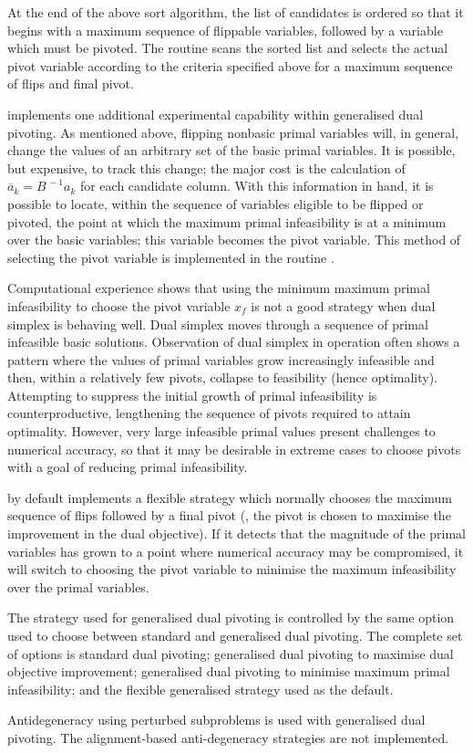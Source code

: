 At the end of the above sort algorithm, the list of candidates is ordered so
that it begins with a maximum sequence of flippable variables, followed by a
variable which must be pivoted.
The routine  scans the sorted list and selects the
actual pivot variable according to the criteria specified above for a maximum
sequence of flips and final pivot.

\dylp implements one additional experimental capability within generalised dual
pivoting.
As mentioned above, flipping nonbasic primal variables will, in general,
change the values of an arbitrary set of the basic primal variables.
It is possible, but expensive, to track this change; the major
cost is the calculation of $\overline{a}_k = B^{\,-1} a_k$ for each candidate
column.
With this information in hand, it is possible to locate, within the sequence of
variables eligible to be flipped or pivoted, the point at which the maximum
primal infeasibility is at a minimum over the basic variables; this variable
becomes the pivot variable.
This method of selecting the pivot variable is implemented in the routine
.

Computational experience shows that using the minimum maximum
primal infeasibility to choose the pivot variable $x_f$ is not a good
strategy when dual simplex is behaving well.
Dual simplex moves through a sequence of primal infeasible basic solutions.
Observation of dual simplex in operation often shows a pattern where the values
of primal variables grow increasingly infeasible and then, within a relatively
few pivots, collapse to feasibility (hence optimality).
Attempting to suppress the initial growth of primal infeasibility is
counterproductive, lengthening the sequence of pivots required to attain
optimality.
However, very large infeasible primal values present challenges to numerical
accuracy, so that it may be desirable in extreme cases to choose pivots
with a goal of reducing primal infeasibility.

\dylp by default implements a flexible strategy which normally chooses
the maximum sequence of flips followed by a final pivot (\ie, the pivot is
chosen to maximise the improvement in the dual objective).
If it detects that the magnitude of the primal variables has grown to a point
where numerical accuracy may be compromised, it will switch to choosing the 
pivot variable to minimise the maximum infeasibility over the primal variables.

The strategy used for generalised dual pivoting is controlled by the same
option used to choose between standard and generalised dual pivoting.
The complete set of options is standard dual pivoting;
generalised dual pivoting to maximise dual objective improvement;
generalised dual pivoting to minimise maximum primal infeasibility;
and the flexible generalised strategy used as the default.

Antidegeneracy using perturbed subproblems is used with generalised dual
pivoting.
The alignment-based anti-degeneracy strategies are not implemented.
